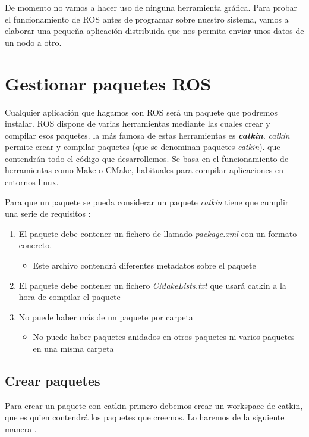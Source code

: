 	De momento no vamos a hacer uso de ninguna herramienta gráfica. Para probar el funcionamiento de ROS antes de programar sobre nuestro sistema, vamos a elaborar una pequeña aplicación distribuida que nos permita enviar unos datos de un nodo a otro.
	
	\section{Gestionar paquetes ROS}
	Cualquier aplicación que hagamos con ROS será un paquete que podremos instalar. ROS dispone de varias herramientas mediante las cuales crear y compilar esos paquetes. la más famosa de estas herramientas es \emph{\textbf{catkin}}. \emph{catkin} permite crear y compilar paquetes (que se denominan paquetes \emph{catkin}). que contendrán todo el código que desarrollemos. Se basa en el funcionamiento de herramientas como Make o CMake, habituales para compilar aplicaciones en entornos linux.
	
	Para que un paquete se pueda considerar un paquete \emph{catkin} tiene que cumplir una serie de requisitos \cite{ros-catkin-create}:
	
	\begin{enumerate}
		\item El paquete debe contener un fichero de llamado \textit{package.xml} con un formato concreto.
		\begin{itemize}
			\item Este archivo contendrá diferentes metadatos sobre el paquete
		\end{itemize}
		\item El paquete debe contener un fichero \textit{CMakeLists.txt} que usará catkin a la hora de compilar el paquete
		\item No puede haber más de un paquete por carpeta
		\begin{itemize}
			\item No puede haber paquetes anidados en otros paquetes ni varios paquetes en una misma carpeta
		\end{itemize}
	\end{enumerate}
	
		\subsection{Crear paquetes}
		Para crear un paquete con catkin primero debemos crear un workspace de catkin, que es quien contendrá los paquetes que creemos. Lo haremos de la siguiente manera \cite{ros-catkin-workspace}.
		
